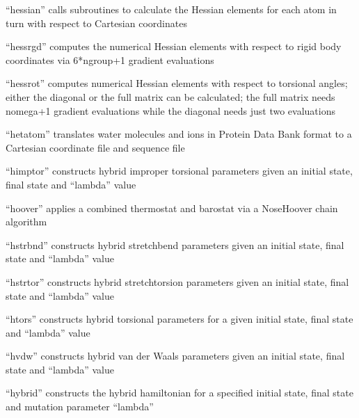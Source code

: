\documentclass[letterpaper,11pt,english]{sphinxmanual}
\begin{document}

“hessian” calls subroutines to calculate the Hessian elements
for each atom in turn with respect to Cartesian coordinates


“hessrgd” computes the numerical Hessian elements with
respect to rigid body coordinates via 6*ngroup+1 gradient
evaluations


“hessrot” computes numerical Hessian elements with respect
to torsional angles; either the diagonal or the full matrix
can be calculated; the full matrix needs nomega+1 gradient
evaluations while the diagonal needs just two evaluations


“hetatom” translates water molecules and ions in Protein Data
Bank format to a Cartesian coordinate file and sequence file


“himptor” constructs hybrid improper torsional parameters
given an initial state, final state and “lambda” value


“hoover” applies a combined thermostat and barostat via a
Nose\sphinxhyphen{}Hoover chain algorithm


“hstrbnd” constructs hybrid stretch\sphinxhyphen{}bend parameters given
an initial state, final state and “lambda” value


“hstrtor” constructs hybrid stretch\sphinxhyphen{}torsion parameters
given an initial state, final state and “lambda” value


“htors” constructs hybrid torsional parameters for a given
initial state, final state and “lambda” value


“hvdw” constructs hybrid van der Waals  parameters given
an initial state, final state and “lambda” value


“hybrid” constructs the hybrid hamiltonian for a specified
initial state, final state and mutation parameter “lambda”
\end{document}
